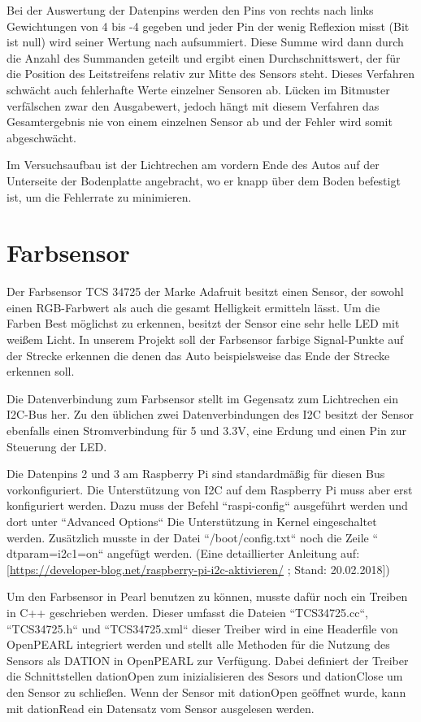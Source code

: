 Bei der Auswertung der Datenpins werden den Pins von rechts nach links Gewichtungen von 4 bis -4 gegeben und jeder Pin der wenig Reflexion misst (Bit ist null) wird seiner Wertung nach aufsummiert. Diese Summe wird dann durch die Anzahl des Summanden geteilt und ergibt einen Durchschnittswert, der für die Position des Leitstreifens relativ zur Mitte des Sensors steht. Dieses Verfahren schwächt auch fehlerhafte Werte einzelner Sensoren ab. Lücken im Bitmuster verfälschen zwar den Ausgabewert, jedoch hängt mit diesem Verfahren das Gesamtergebnis nie von einem einzelnen Sensor ab und der Fehler wird somit abgeschwächt. 

Im Versuchsaufbau ist der Lichtrechen am vordern Ende des Autos auf der Unterseite der Bodenplatte angebracht, wo er knapp über dem Boden befestigt ist, um die Fehlerrate zu minimieren.


\section{Farbsensor}
Der Farbsensor TCS 34725 der Marke Adafruit besitzt einen Sensor, der sowohl einen RGB-Farbwert als auch die gesamt Helligkeit ermitteln lässt. Um die Farben Best möglichst zu erkennen, besitzt der Sensor eine sehr helle LED mit weißem Licht. In unserem Projekt soll der Farbsensor farbige Signal-Punkte auf der Strecke erkennen die denen das Auto beispielsweise das Ende der Strecke erkennen soll. 

Die Datenverbindung zum Farbsensor stellt im Gegensatz zum Lichtrechen ein I2C-Bus her. Zu den üblichen zwei Datenverbindungen des I2C besitzt der Sensor ebenfalls einen Stromverbindung für 5 und 3.3V, eine Erdung und einen Pin zur Steuerung der LED.

Die Datenpins 2 und 3 am Raspberry Pi sind standardmäßig für diesen Bus vorkonfiguriert. Die Unterstützung von I2C auf dem Raspberry Pi muss aber erst konfiguriert werden. Dazu muss der Befehl “raspi-config“ ausgeführt werden und dort unter “Advanced Options“ Die Unterstützung in Kernel eingeschaltet werden. Zusätzlich musste in der Datei “/boot/config.txt“ noch die Zeile “ dtparam=i2c1=on“ angefügt werden. (Eine detaillierter Anleitung auf: [\url{https://developer-blog.net/raspberry-pi-i2c-aktivieren/} ; Stand: 20.02.2018])

Um den Farbsensor in Pearl benutzen zu können, musste dafür noch ein Treiben in C++ geschrieben werden. Dieser umfasst die Dateien “TCS34725.cc“, “TCS34725.h“ und “TCS34725.xml“ dieser Treiber wird in eine Headerfile von OpenPEARL integriert werden und stellt alle Methoden für die Nutzung des Sensors als DATION in OpenPEARL zur Verfügung. Dabei definiert der Treiber die Schnittstellen dationOpen zum inizialisieren des Sesors und dationClose um den Sensor zu schließen. Wenn der Sensor mit dationOpen geöffnet wurde, kann mit dationRead ein Datensatz vom Sensor ausgelesen werden. 

